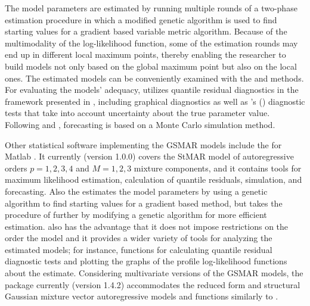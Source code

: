 \documentclass[nojss]{jss} %
\begin{document}
The model parameters are estimated by running multiple rounds of a two-phase estimation procedure in which a modified genetic algorithm is used to find starting values for a gradient based variable metric algorithm. Because of the multimodality of the log-likelihood function, some of the estimation rounds may end up in different local maximum points, thereby enabling the researcher to build models not only based on the global maximum point but also on the local ones. The estimated models can be conveniently examined with the  and  methods. For evaluating the models' adequacy,  utilizes quantile residual diagnostics in the framework presented in \cite{Kalliovirta:2012}, including graphical diagnostics as well as \citeauthor{Kalliovirta:2012}'s (\citeyear{Kalliovirta:2012}) diagnostic tests that take into account uncertainty about the true parameter value. Following \cite{Kalliovirta+Meitz+Saikkonen:2015} and \cite{Meitz+Preve+Saikkonen:2021}, forecasting is based on a Monte Carlo simulation method.

Other statistical software implementing the GSMAR models include the  for Matlab \citep{Meitz+Preve+Saikkonen2:2018}. It currently (version 1.0.0) covers the StMAR model of autoregressive orders $p=1,2,3,4$ and $M=1,2,3$ mixture components, and it contains tools for maximum likelihood estimation, calculation of quantile residuals, simulation, and forecasting. Also the  estimates the model parameters by using a genetic algorithm to find starting values for a gradient based method, but  takes the procedure of \cite{Meitz+Preve+Saikkonen:2021, Meitz+Preve+Saikkonen2:2018} further by modifying a genetic algorithm for more efficient estimation.  also has the advantage that it does not impose restrictions on the order the model and it provides a wider variety of tools for analyzing the estimated models; for instance, functions for calculating quantile residual diagnostic tests \citep{Kalliovirta:2012} and plotting the graphs of the profile log-likelihood functions about the estimate. Considering multivariate versions of the GSMAR models, the  package  \citep{Virolainen:2021} currently (version 1.4.2) accommodates the reduced form and structural Gaussian mixture vector autoregressive models \citep{Kalliovirta+Meitz+Saikkonen:2016, Virolainen2:2020} and functions similarly to .
\end{document}
